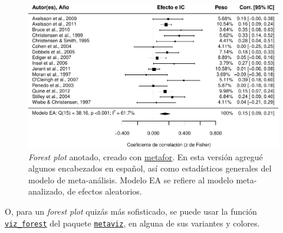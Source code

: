 \documentclass[
  bookmarksnumbered]{article}
\begin{document}
\begin{figure}
\centering
\includegraphics{Meta-analysis_files/figure-latex/for-plot2-1.pdf}
\caption{\label{fig:for-plot2}\emph{Forest plot} anotado, creado con \href{https://www.metafor-project.org/doku.php}{metafor}. En esta versión agregué algunos encabezados en español, así como estadísticos generales del modelo de meta-análisis. Modelo EA se refiere al modelo meta-analizado, de efectos aleatorios.}
\end{figure}

O, para un \emph{forest plot} quizás más sofisticado, se puede usar la función \href{https://cran.r-project.org/web/packages/metaviz/vignettes/metaviz.html\#creating-forest-plots-with-function-viz_forest}{\texttt{viz\_forest}} del paquete \href{https://cran.r-project.org/web/packages/metaviz/vignettes/metaviz.html}{\texttt{metaviz}}, en alguna de sus variantes y colores.
\end{document}
